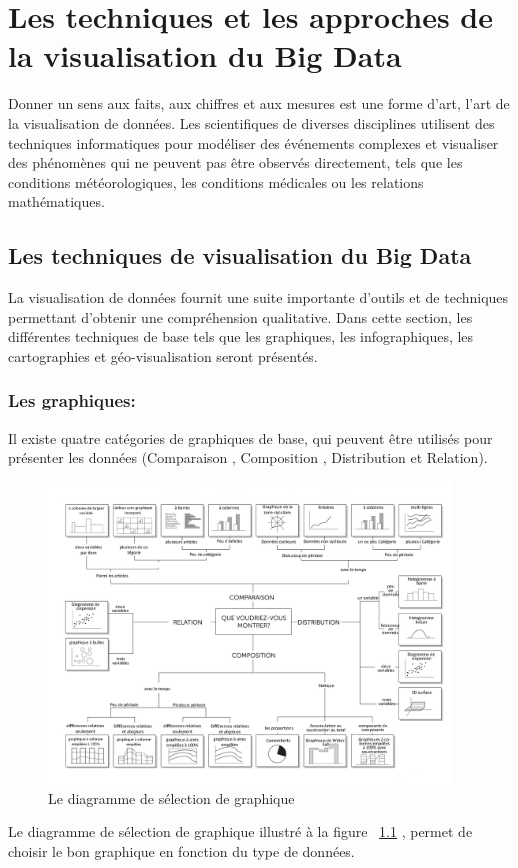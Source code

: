 \documentclass[french, a4paper, 12pt]{report}
\begin{document}

\chapter{Les techniques et les approches de la visualisation du Big Data}
Donner un sens aux faits, aux chiffres et aux mesures est une forme d'art, l'art de la visualisation de données. Les scientifiques de diverses disciplines utilisent des techniques informatiques pour modéliser des événements complexes et visualiser des phénomènes qui ne peuvent pas être observés directement, tels que les conditions météorologiques, les conditions médicales ou les relations mathématiques.
\section{Les techniques de visualisation du Big Data}
La visualisation de données fournit une suite importante d’outils et de techniques permettant d’obtenir une compréhension qualitative. Dans cette section, les différentes techniques de base tels que les graphiques, les infographiques,  les cartographies et géo-visualisation seront présentés.
\subsection{Les graphiques:}
Il existe quatre catégories de graphiques de base, qui peuvent être utilisés pour présenter les données (Comparaison , Composition , Distribution et Relation).
\begin{figure}[!ht]
    \centering
    \includegraphics[height=8cm]{images/diagramme-de-charts.jpg}
    \caption{Le diagramme de sélection de graphique}
    \label{fig:2.1}
\end{figure}
 Le diagramme de sélection de graphique illustré à la figure ~\ref{fig:2.1}
, permet de choisir le bon graphique en fonction du type de données.
\end{document}
